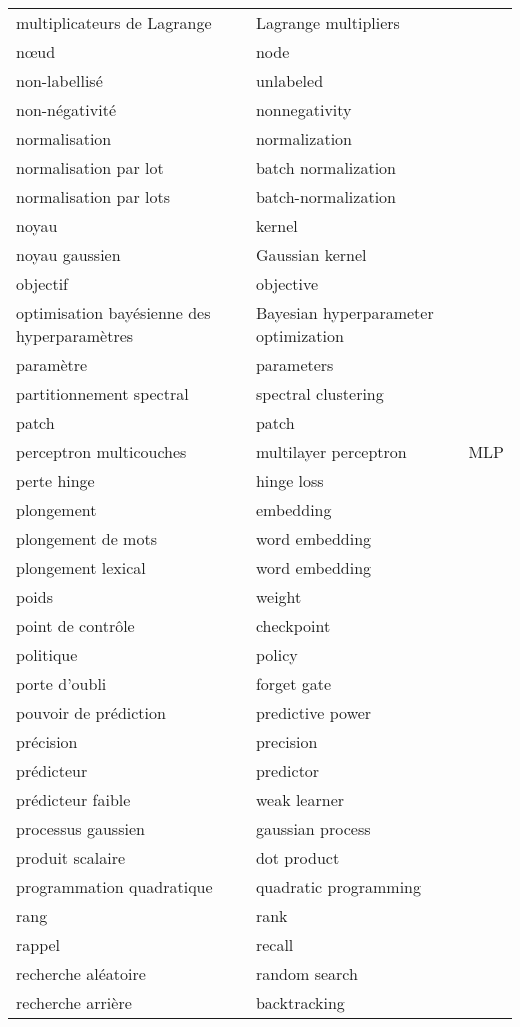 \begin{longtable}{p{} p{} p{}}
multiplicateurs de Lagrange & Lagrange multipliers &  \\ 
nœud & node &  \\ 
non-labellisé & unlabeled &  \\ 
non-négativité & nonnegativity &  \\ 
normalisation & normalization &  \\ 
normalisation par lot & batch normalization &  \\ 
normalisation par lots & batch-normalization &  \\ 
noyau & kernel &  \\ 
noyau gaussien & Gaussian kernel &  \\ 
objectif & objective &  \\ 
optimisation bayésienne des hyperparamètres & Bayesian hyperparameter optimization &  \\ 
paramètre & parameters &  \\ 
partitionnement spectral & spectral clustering &  \\ 
patch & patch &  \\ 
perceptron multicouches & multilayer perceptron & MLP \\ 
perte hinge & hinge loss &  \\ 
plongement & embedding &  \\ 
plongement de mots & word embedding &  \\ 
plongement lexical & word embedding &  \\ 
poids & weight &  \\ 
point de contrôle & checkpoint &  \\ 
politique & policy &  \\ 
porte d'oubli & forget gate &  \\ 
pouvoir de prédiction & predictive power &  \\ 
précision & precision &  \\ 
prédicteur & predictor &  \\ 
prédicteur faible & weak learner &  \\ 
processus gaussien & gaussian process &  \\ 
produit scalaire & dot product &  \\ 
programmation quadratique & quadratic programming &  \\ 
rang & rank &  \\ 
rappel & recall &  \\ 
recherche aléatoire & random search &  \\ 
recherche arrière & backtracking &  \\ 

\end{longtable}
